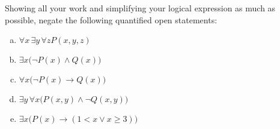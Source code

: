 \documentclass[11pt,letterpaper]{article}
\begin{document}
\newpage



 Showing all your work and simplifying your logical expression as much as possible, negate the following quantified open statements:
	\begin{enumerate}[(a)]
	\item $\forall x\, \exists y\, \forall z P(x, y, z)$
	\item $\exists x \big( \neg P(x) \wedge Q(x) \big)$
	\item $\forall x \big( \neg P(x) \to Q(x) \big)$
	\item $\exists y\, \forall x \big( P(x, y) \wedge \neg Q(x, y) \big)$
	\item $\exists x \big( P(x) \to (1 < x \vee x \geq 3) \big)$
	\end{enumerate} \pspace
\end{document}
